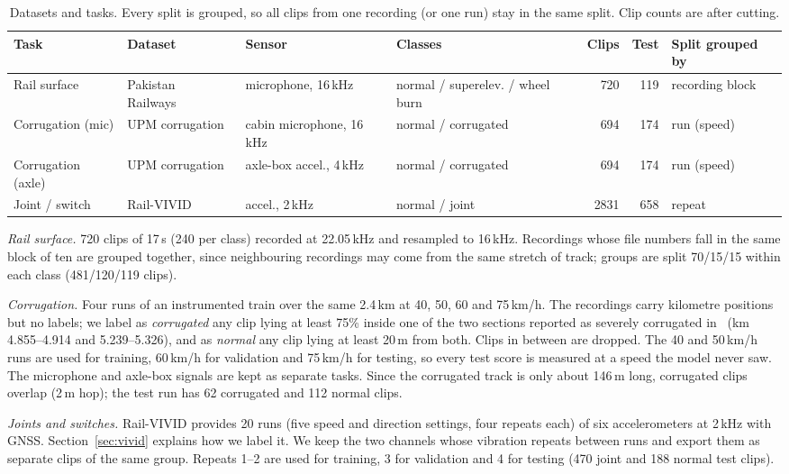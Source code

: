 \documentclass[conference]{IEEEtran}
\begin{document}
\begin{table}[t]
\centering
\caption{Datasets and tasks. Every split is grouped, so all clips from one recording (or one
run) stay in the same split. Clip counts are after cutting.}
\label{tab:data}
\begin{tabular}{llllrrl}
\toprule
Task & Dataset & Sensor & Classes & Clips & Test & Split grouped by \\
\midrule
Rail surface       & Pakistan Railways~\cite{shafique2021} & microphone, 16\,kHz & normal / superelev. / wheel burn & 720 & 119 & recording block \\
Corrugation (mic)  & UPM corrugation~\cite{upmcorrugation} & cabin microphone, 16\,kHz & normal / corrugated & 694 & 174 & run (speed) \\
Corrugation (axle) & UPM corrugation~\cite{upmcorrugation} & axle-box accel., 4\,kHz & normal / corrugated & 694 & 174 & run (speed) \\
Joint / switch     & Rail-VIVID~\cite{ma2026railvivid}     & accel., 2\,kHz & normal / joint & 2831 & 658 & repeat \\
\bottomrule
\end{tabular}
\end{table}

\textit{Rail surface.} 720 clips of 17\,s (240 per class) recorded at 22.05\,kHz and resampled to
16\,kHz. Recordings whose file numbers fall in the same block of ten are grouped together,
since neighbouring recordings may come from the same stretch of track; groups are split
70/15/15 within each class (481/120/119 clips).

\textit{Corrugation.} Four runs of an instrumented train over the same 2.4\,km at 40, 50, 60 and
75\,km/h. The recordings carry kilometre positions but no labels; we label as \emph{corrugated}
any clip lying at least 75\% inside one of the two sections reported as severely corrugated
in~\cite{soto2025} (km 4.855--4.914 and 5.239--5.326), and as \emph{normal} any clip lying at
least 20\,m from both. Clips in between are dropped. The 40 and 50\,km/h runs are used for
training, 60\,km/h for validation and 75\,km/h for testing, so every test score is measured at a
speed the model never saw. The microphone and axle-box signals are kept as separate tasks.
Since the corrugated track is only about 146\,m long, corrugated clips overlap (2\,m hop); the
test run has 62 corrugated and 112 normal clips.

\textit{Joints and switches.} Rail-VIVID provides 20 runs (five speed and direction settings,
four repeats each) of six accelerometers at 2\,kHz with GNSS. Section~\ref{sec:vivid} explains
how we label it. We keep the two channels whose vibration repeats between runs and export them
as separate clips of the same group. Repeats 1--2 are used for training, 3 for validation and 4
for testing (470 joint and 188 normal test clips).
\end{document}
